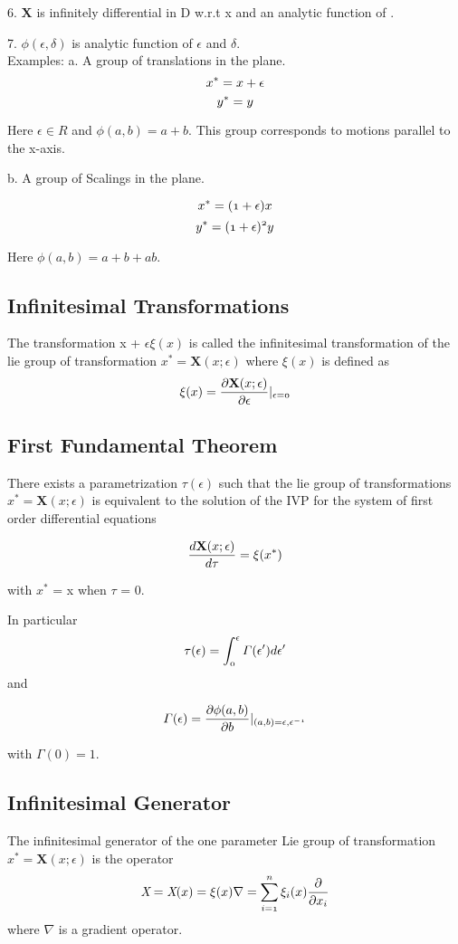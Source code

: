 \documentclass[A4paper, 22pt]{article}
\begin{document}
6. $\textbf{X}$ is infinitely differential in D w.r.t x and an analytic function of \epsilon. 

7. $\phi(\epsilon,\delta)$ is analytic function of $\epsilon$ and $\delta$.\\

Examples:
a. A group of translations in the plane.
\[
\mathnormal{x^{*} = x + \epsilon}\]
\[
\mathnormal{y^{*} = y}\]

Here $\epsilon \in R$ and $\phi(a,b) = a + b$. This group corresponds to motions parallel to the x-axis.

b. A group of Scalings in the plane.

\[
\mathnormal{x^{*} = (1 + \epsilon)x}\]
\[
\mathnormal{y^{*} = (1 + \epsilon)^{2}y}\]

Here $\phi(a,b) = a + b + ab$.


\subsection{Infinitesimal Transformations}

The transformation x + $\epsilon \xi(x)$ is called the infinitesimal transformation of the lie group of transformation $x^{*} = \textbf{X}(x;\epsilon)$ where $\xi(x)$ is defined as 
\[
 \mathnormal{\xi(x) = \frac{\partial \textbf{X}(x;\epsilon)}{\partial \epsilon}|_{\epsilon=0} }   
\]

\subsection{First Fundamental Theorem}

There exists a parametrization $\tau(\epsilon)$ such that the lie group of transformations $x^{*} = \textbf{X}(x;\epsilon)$ is equivalent to the solution of the IVP for the system of first order differential equations 

\[
 \mathnormal{\frac{d\textbf{X}(x;\epsilon)}{d\tau} =  \xi(x^{*})}   
\]

with $x^{*}$ = x when $\tau$ = 0.

In particular 
\[
\mathnormal{\tau(\epsilon) = \int_{0}^{\epsilon} \Gamma(\epsilon') d\epsilon'}
\]
and 

\[
  \mathnormal{\Gamma(\epsilon) = \frac{\partial \phi(a,b)}{\partial b}|_{(a,b) = \epsilon, \epsilon^{-1}}}
\]

with $\Gamma(0) = 1$.


\subsection{Infinitesimal Generator}
The infinitesimal generator of the one parameter Lie group of transformation $x^{*} = \textbf{X}(x;\epsilon)$ is the operator 
\[
\mathnormal{ \textit{X} = \textit{X}(x) = \xi(x) \nabla = \sum_{i=1}^{n} \xi_i(x)\frac{\partial }{\partial x_i}}
\]
 where $\nabla$ is a gradient operator.
 
\end{document}
